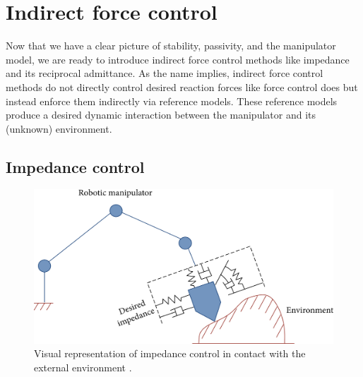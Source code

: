 \section{Indirect force control}

Now that we have a clear picture of stability, passivity, and the manipulator model, we are ready to introduce indirect force control methods like impedance and its reciprocal admittance. As the name implies, indirect force control methods do not directly control desired reaction forces like force control does but instead enforce them indirectly via reference models. These reference models produce a desired dynamic interaction between the manipulator and its (unknown) environment.

\subsection{Impedance control}

\begin{figure}
  \centering
  \includegraphics[width=0.5\linewidth]{figures/alshuka_2018.png}

  \caption[Impedance controlled manipulator in contact with the environment.]{Visual representation of impedance control in contact with the external environment \cite{al-shukaActiveImpedanceControl2018}.} \label{fig:impedance_control}
\end{figure}

